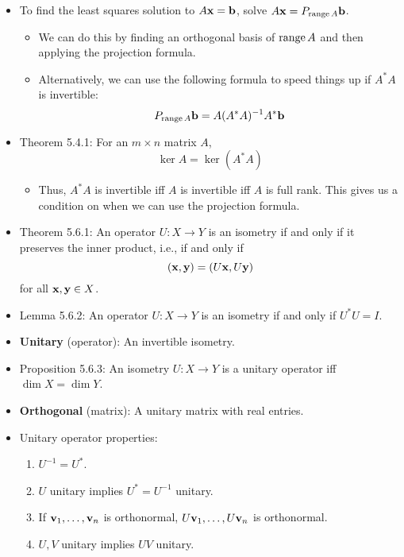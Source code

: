\documentclass[../../notes.tex]{subfiles}
\begin{document}
\begin{itemize}
    \item To find the least squares solution to $A\mathbf{x}=\mathbf{b}$, solve $A\mathbf{x}=P_{\operatorname{range} A}\mathbf{b}$.
    \begin{itemize}
        \item We can do this by finding an orthogonal basis of $\operatorname{range} A$ and then applying the projection formula.
        \item Alternatively, we can use the following formula to speed things up if $A^*A$ is invertible:
        \begin{equation*}
            P_{\operatorname{range} A}\mathbf{b} = A(A^*A)^{-1}A^*\mathbf{b}
        \end{equation*}
    \end{itemize}
    \item Theorem 5.4.1: For an $m\times n$ matrix $A$,
    \begin{equation*}
        \ker A = \ker(A^*A)
    \end{equation*}
    \begin{itemize}
        \item Thus, $A^*A$ is invertible iff $A$ is invertible iff $A$ is full rank. This gives us a condition on when we can use the projection formula.
    \end{itemize}
    \item Theorem 5.6.1: An operator $U:X\to Y$ is an isometry if and only if it preserves the inner product, i.e., if and only if
    \begin{equation*}
        (\mathbf{x},\mathbf{y}) = (U\mathbf{x},U\mathbf{y})
    \end{equation*}
    for all $\mathbf{x},\mathbf{y}\in X$.
    \item Lemma 5.6.2: An operator $U:X\to Y$ is an isometry if and only if $U^*U=I$.
    \item \textbf{Unitary} (operator): An invertible isometry.
    \item Proposition 5.6.3: An isometry $U:X\to Y$ is a unitary operator iff $\dim X=\dim Y$.
    \item \textbf{Orthogonal} (matrix): A unitary matrix with real entries.
    \item Unitary operator properties:
    \begin{enumerate}
        \item $U^{-1}=U^*$.
        \item $U$ unitary implies $U^*=U^{-1}$ unitary.
        \item If $\mathbf{v}_1,\dots,\mathbf{v}_n$ is orthonormal, $U\mathbf{v}_1,\dots,U\mathbf{v}_n$ is orthonormal.
        \item $U,V$ unitary implies $UV$ unitary.

\end{enumerate}
\end{itemize}
\end{document}
